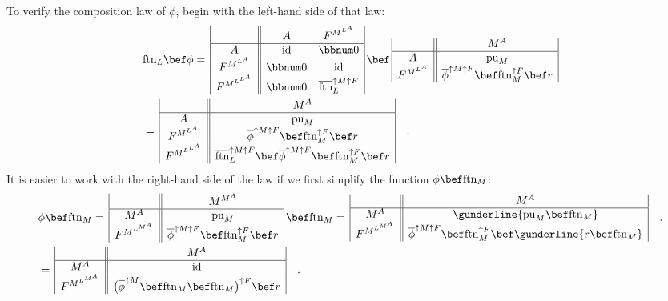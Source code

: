 To verify the composition law of $\phi$, begin with the left-hand
side of that law:
\begin{align*}
 & \text{ftn}_{L}\bef\phi=\,\begin{array}{|c||cc|}
 & A & F^{M^{L^{A}}}\\
\hline A & \text{id} & \bbnum 0\\
F^{M^{L^{A}}} & \bbnum 0 & \text{id}\\
F^{M^{L^{L^{A}}}} & \bbnum 0 & \overline{\text{ftn}}_{L}^{\uparrow M\uparrow F}
\end{array}\,\bef\,\begin{array}{|c||c|}
 & M^{A}\\
\hline A & \text{pu}_{M}\\
F^{M^{L^{A}}} & \overline{\phi}^{\uparrow M\uparrow F}\bef\text{ftn}_{M}^{\uparrow F}\bef r
\end{array}\\
 & =\,\begin{array}{|c||c|}
 & M^{A}\\
\hline A & \text{pu}_{M}\\
F^{M^{L^{A}}} & \overline{\phi}^{\uparrow M\uparrow F}\bef\text{ftn}_{M}^{\uparrow F}\bef r\\
F^{M^{L^{L^{A}}}} & \overline{\text{ftn}}_{L}^{\uparrow M\uparrow F}\bef\overline{\phi}^{\uparrow M\uparrow F}\bef\text{ftn}_{M}^{\uparrow F}\bef r
\end{array}\quad.
\end{align*}
It is easier to work with the right-hand side of the law if we first
simplify the function $\phi\bef\text{ftn}_{M}$: 
\begin{align*}
 & \phi\bef\text{ftn}_{M}=\,\begin{array}{|c||c|}
 & M^{M^{A}}\\
\hline M^{A} & \text{pu}_{M}\\
F^{M^{L^{M^{A}}}} & \overline{\phi}^{\uparrow M\uparrow F}\bef\text{ftn}_{M}^{\uparrow F}\bef r
\end{array}\,\bef\text{ftn}_{M}=\,\begin{array}{|c||c|}
 & M^{A}\\
\hline M^{A} & \gunderline{\text{pu}_{M}\bef\text{ftn}_{M}}\\
F^{M^{L^{M^{A}}}} & \overline{\phi}^{\uparrow M\uparrow F}\bef\text{ftn}_{M}^{\uparrow F}\bef\gunderline{r\bef\text{ftn}_{M}}
\end{array}\quad.\\
 & =\,\begin{array}{|c||c|}
 & M^{A}\\
\hline M^{A} & \text{id}\\
F^{M^{L^{M^{A}}}} & \big(\overline{\phi}^{\uparrow M}\bef\text{ftn}_{M}\bef\text{ftn}_{M}\big)^{\uparrow F}\bef r
\end{array}\quad.
\end{align*}
